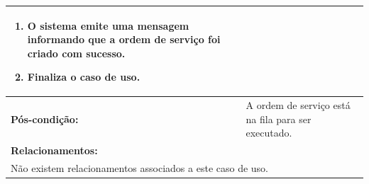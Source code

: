 \documentclass[
	12pt,				%
	openright,
	oneside,			%
	a4paper,			%
	chapter=TITLE,		%
	brazil				%
	]{abntex2}
\begin{document}
\begin{table}[h]
\begin{tabular}{|p{3cm}|p{3cm}|p{3cm}|p{3cm}|}
{\begin{enumerate}
  \item O sistema emite uma mensagem informando que a ordem de serviço foi criado com sucesso.
  \item Finaliza o caso de uso.
\end{enumerate}}                                                               				 							\\ \hline
\textbf{Pós-condição: }  & \multicolumn{3}{p{9cm}|}{A ordem de serviço está na fila para ser executado.}		\\ \hline
\multicolumn{4}{|p{12cm}|}{\textbf{Relacionamentos:}}                                        								\\ \hline
\multicolumn{4}{|p{12cm}|}{Não existem relacionamentos associados a este caso de uso.}                                  \\ \hline
\end{tabular}
\end{table}
\end{document}
